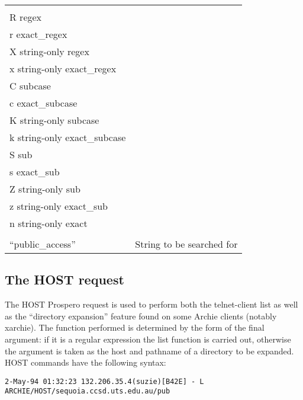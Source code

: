 \begin{center}
\begin{tabular}{|l|p{4in}|}
\begin{tabbing}
= \= exact \\ 
R \> regex \\
r \> exact\_regex \\
X \> string-only regex \\
x \> string-only exact\_regex \\
C \> subcase \\
c \> exact\_subcase \\
K \> string-only subcase \\
k \> string-only exact\_subcase \\
S \> sub \\
s \> exact\_sub \\
Z \> string-only sub \\
z \> string-only exact\_sub \\
n \> string-only exact \\
\end{tabbing}
\\ \hline

``public\_access'' & String to be searched for \\ \hline
\end{tabular}
\end{center}


\subsection{The HOST request}

The HOST Prospero request is used to perform both the telnet-client list as
well as the ``directory expansion'' feature found on some Archie clients
(notably xarchie). The function performed is determined by the form of the
final argument: if it is a regular expression the list function is carried
out, otherwise the argument is taken as the host and pathname of a directory
to be expanded. HOST commands have the following syntax:



\begin{center} \texttt{2-May-94 01:32:23 132.206.35.4(suzie)[B42E] - L
ARCHIE/HOST/sequoia.ccsd.uts.edu.au/pub}
\end{center}

